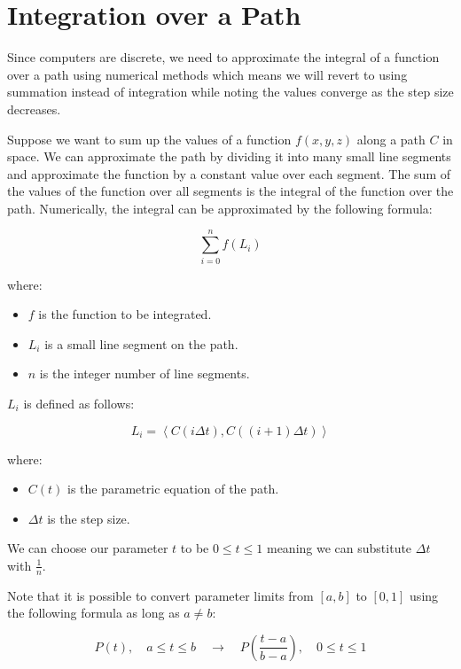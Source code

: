 \documentclass[12pt]{article}
\begin{document}
\newpage
\section{Integration over a Path}

Since computers are discrete, we need to approximate the integral of a function over a path using numerical methods which means we will revert to using summation instead of integration while noting the values converge as the step size decreases.

Suppose we want to sum up the values of a function \(f(x, y, z)\) along a path \(C\) in space.
We can approximate the path by dividing it into many small line segments and approximate the function by a constant value over each segment.
The sum of the values of the function over all segments is the integral of the function over the path.
Numerically, the integral can be approximated by the following formula:

\[
    \sum_{i=0}^{n} f(L_i)
\]

where:

\begin{itemize}
    \item \(f\) is the function to be integrated.
    \item \(L_i\) is a small line segment on the path.
    \item \(n\) is the integer number of line segments.
\end{itemize}

\(L_i\) is defined as follows:

\[
    L_i = \left\langle C\left(i \Delta t\right), C\left((i + 1)\Delta t\right)\right\rangle
\]

where:

\begin{itemize}
    \item \(C(t)\) is the parametric equation of the path.
    \item \(\Delta t\) is the step size.
\end{itemize}

We can choose our parameter \(t\) to be \(0 \leq t \leq 1\) meaning we can substitute \(\Delta t\) with
\(\frac{1}{n}\).

Note that it is possible to convert parameter limits from \([a, b]\) to \([0, 1]\) using the following formula as long as \(a \neq b\):

\[
    P(t), \quad a \leq t \leq b \quad \rightarrow \quad P\left(\frac{t - a}{b - a}\right), \quad 0 \leq t \leq 1
\]
\end{document}
